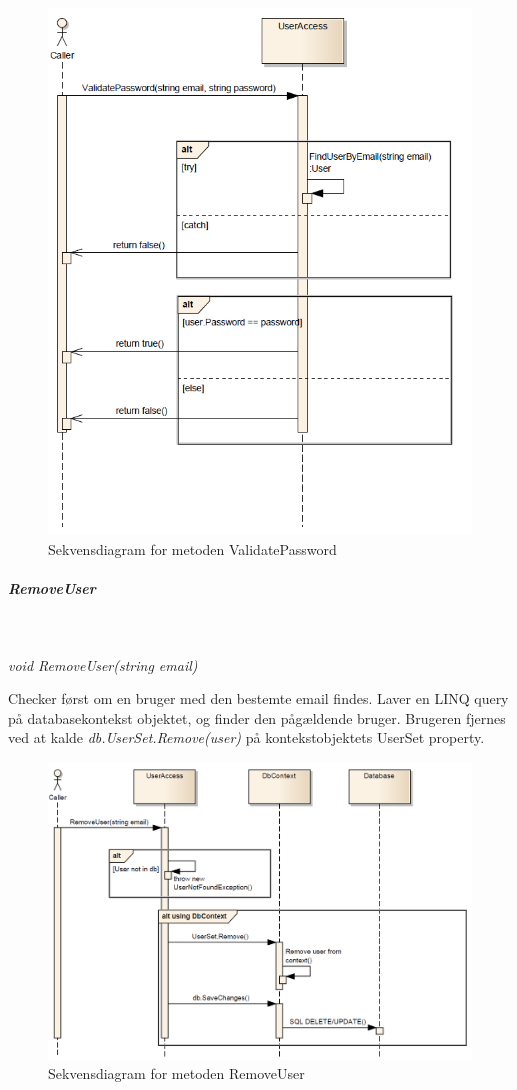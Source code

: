 \begin{figure}[h]
\centering
\includegraphics[width=0.7\linewidth]{figs/dbSeq/validatePassword.PNG}
\caption{Sekvensdiagram for metoden ValidatePassword}
\label{fig:validatePassword}
\end{figure}


\subparagraph{RemoveUser}\

\textit{void RemoveUser(string email)}

Checker først om en bruger med den bestemte email findes.
Laver en LINQ query på databasekontekst objektet, og finder den pågældende bruger.
Brugeren fjernes ved at kalde \textit{db.UserSet.Remove(user)} på kontekstobjektets UserSet property.

\begin{figure}[H]
\centering
\includegraphics[width=\linewidth]{figs/dbSeq/removeUser.PNG}
\caption{Sekvensdiagram for metoden RemoveUser}
\label{fig:removeUser}
\end{figure}


